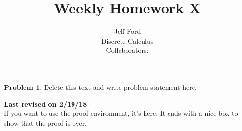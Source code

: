 \documentclass[12 pt]{article}
\theoremstyle{definition}
\newtheorem*{prob}{Problem}
\newcommand\rev[1]{\noindent\textbf{Last revised on {#1}}\\}
\begin{document}
 
 
\title{Weekly Homework X}%
\author{Jeff Ford\\ %
Discrete Calculus\\
Collaborators: } %
 
\maketitle
 
\begin{prob} 
Delete this text and write problem statement here.
\end{prob}
\rev{2/19/18} %
If you want to use the proof environment, it's here. It ends with a nice box to show that the proof is over.
\end{document}
